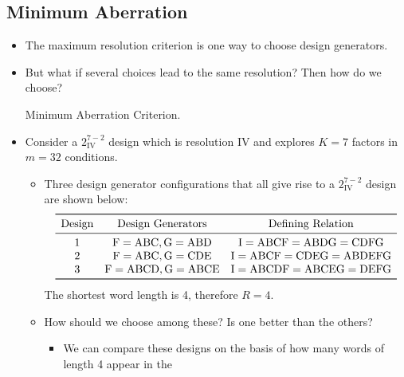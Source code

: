 \subsection{Minimum Aberration}
\begin{itemize}
      \item The maximum resolution criterion is one way to choose design generators.
      \item But what if several choices lead to the same resolution? Then how do we choose?
            \begin{tightcenter}
                  Minimum Aberration Criterion.
            \end{tightcenter}
      \item Consider a $ 2^{7-2}_{\text{IV}} $ design which is resolution IV and explores $K = 7$ factors in $m = 32$ conditions.
            \begin{itemize}
                  \item Three design generator configurations that all give rise to a $ 2^{7-2}_{\text{IV}} $ design are shown below:
                        \[ \begin{matrix}
                                    \toprule
                                    \text{Design} & \text{Design Generators}                  & \text{Defining Relation}                       \\
                                    \midrule
                                    1             & \text{F}=\text{ABC},\text{G}=\text{ABD}   & \text{I}=\text{ABCF}=\text{ABDG}=\text{CDFG}   \\
                                    2             & \text{F}=\text{ABC},\text{G}=\text{CDE}   & \text{I}=\text{ABCF}=\text{CDEG}=\text{ABDEFG} \\
                                    3             & \text{F}=\text{ABCD},\text{G}=\text{ABCE} & \text{I}=\text{ABCDF}=\text{ABCEG}=\text{DEFG} \\
                                    \bottomrule
                              \end{matrix} \]
                        The shortest word length is 4, therefore $ R=4 $.
                  \item How should we choose among these? Is one better than the others?
                        \begin{itemize}[*]
                              \item We can compare these designs on the basis of how many words of length 4 appear in the

\end{itemize}
\end{itemize}
\end{itemize}
